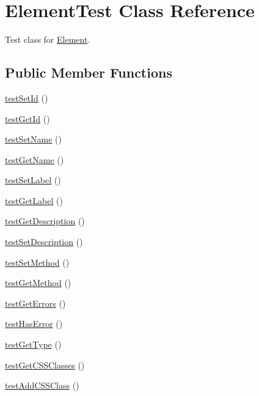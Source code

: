 \hypertarget{class_element_test}{
\section{ElementTest Class Reference}
\label{class_element_test}
}


Test class for \hyperlink{class_element}{Element}.  


\subsection*{Public Member Functions}
\begin{DoxyCompactItemize}
\item 
\hyperlink{class_element_test_ab3dcacda3661269b9eaf705fd084f986}{testSetId} ()
\item 
\hyperlink{class_element_test_a9231e9c3534abf04eb0c88ad68084882}{testGetId} ()
\item 
\hyperlink{class_element_test_a4cd685f2226d97a555ffda557a9d1f0d}{testSetName} ()
\item 
\hyperlink{class_element_test_a8582a7bb093ec85856a19e1c1b7cb983}{testGetName} ()
\item 
\hyperlink{class_element_test_ac0b97eef14e1d3c09a7127674fae02a2}{testSetLabel} ()
\item 
\hyperlink{class_element_test_a55e565b9c7813d8c3e26162ca0498ba1}{testGetLabel} ()
\item 
\hyperlink{class_element_test_a3790876f52cb2ba5294a55a3742b513b}{testGetDescription} ()
\item 
\hyperlink{class_element_test_aa4a15c34620107dd431e86ad70441452}{testSetDescription} ()
\item 
\hyperlink{class_element_test_a555789228c0bf03172e990bcc78d07b5}{testSetMethod} ()
\item 
\hyperlink{class_element_test_a4a0b2f826196a62840fae918ee0c6970}{testGetMethod} ()
\item 
\hyperlink{class_element_test_ab70a1761fe544b7a5b67bfd7b582b3b6}{testGetErrors} ()
\item 
\hyperlink{class_element_test_a0dfd9f7c9457ea0bd42438ad7c49f0ff}{testHasError} ()
\item 
\hyperlink{class_element_test_afcd208ff3eaa905d4ba0a7e8957bc782}{testGetType} ()
\item 
\hyperlink{class_element_test_aeb29d280844b044338e05b20a707ca98}{testGetCSSClasses} ()
\item 
\hyperlink{class_element_test_a18b0e22d475b12dc3f9291c62eb121b3}{testAddCSSClass} ()

\end{DoxyCompactItemize}
